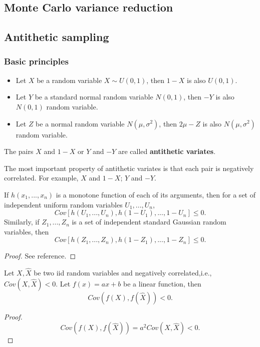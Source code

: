 \begin{refsection}
\section{Monte Carlo variance reduction}
\subsection{Antithetic sampling}
\subsubsection{Basic principles}
\begin{definition}\hfill
	\begin{itemize}
		\item Let $X$ be a random variable $X\sim U(0,1)$, then $1-X$ is also $U(0,1)$.
		\item Let $Y$ be a standard normal random variable $N(0,1)$, then $-Y$ is also $N(0,1)$ random variable.  
		\item Let $Z$ be a  normal random variable $N(\mu,\sigma^2)$, then $2\mu-Z$ is also $N(\mu,\sigma^2)$ random variable. 
	\end{itemize}
	The pairs $X$ and $1-X$ or $Y$ and $-Y$ are called \textbf{antithetic variates}. 
\end{definition}

\begin{remark}
	The most important property of antithetic variates is that each pair is negatively correlated. For example, $X$ and $1-X$; $Y$ and $-Y$.
\end{remark}


\begin{theorem}\cite[209]{ross2013simulation}\label{ch:MonteCarlo-methods--optimization:th:preservingnegativecorrelationsviamonotonefunction}
	If $h(x_1,...,x_n)$ is a monotone function of each of its arguments, then for a set of independent uniform random variables $U_1,...,U_n$, 
	$$Cov[h(U_1,...,U_n),h(1-U_1),...,1-U_n]\leq 0.$$
	Similarly, if $Z_1,...,Z_n$ is a set of independent standard Gaussian random variables, then
	$$Cov[h(Z_1,...,Z_n),h(1-Z_1),...,1-Z_n]\leq 0.$$
\end{theorem}
\begin{proof}
	See reference.
\end{proof}

\begin{lemma}
	Let $X,\hat{X}$ be two iid random variables and negatively correlated,i.e., $Cov(X,\hat{X}) < 0$. Let $f(x)=ax+b$ be a linear function, then
	$$Cov(f(X),f(\hat{X}))  < 0.$$
\end{lemma}
\begin{proof}
	$$Cov(f(X),f(\hat{X})) = a^2 Cov(X,\hat{X}) < 0.$$
\end{proof}


\end{refsection}
